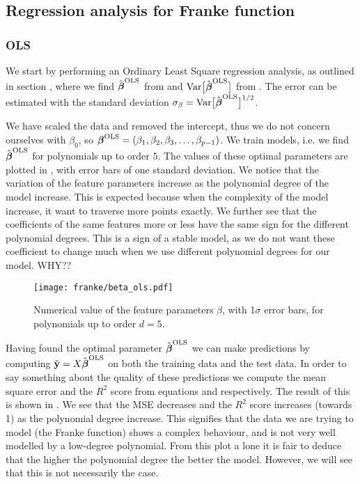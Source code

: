     \subsection{Regression analysis for Franke function}\label{sec:reganalysis_franke}

        \subsubsection{OLS}\label{sec:olsanalysis}
            We start by performing an Ordinary Least Square regression analysis, as outlined in section , where we find $\hat{\boldsymbol{\beta}}^\text{OLS}$ from  and $\text{Var}\big[\hat{\boldsymbol{\beta}}^{\text{OLS}}\big]$ from . The error can be estimated with the standard deviation $\mathbf{\sigma}_{\beta} = \text{Var}\big[\hat{\boldsymbol{\beta}}^{\text{OLS}}\big]^{1/2}$. 

            We have scaled the data and removed the intercept, thus we do not concern ourselves with $\beta_0$, so $\boldsymbol{\beta}^{\text{OLS}} = (\beta_1, \beta_2, \beta_3, \dots, \beta_{p-1})$. We train models, i.e. we find $\hat{\boldsymbol{\beta}}^{\text{OLS}}$ for polynomials up to order $5$. The values of these optimal parameters are plotted in , with error bars of one standard deviation. We notice that the variation of the feature parameters increase as the polynomial degree of the model increase. This is expected because when the complexity of the model increase, it want to traverse more points exactly. We further see that the coefficients of the same features more or less have the same sign for the different polynomial degrees. This is a sign of a stable model, as we do not want these coefficient to change much when we use different polynomial degrees for our model. WHY??

            \begin{figure}
                \texttt{[image: franke/beta\_ols.pdf]}
                \caption{Numerical value of the feature parameters $\beta$, with 1$\sigma$ error bars, for polynomials up to order $d=5$.}
                \label{fig:beta_with_standard_deviation}
            \end{figure}

            Having found the optimal parameter $\hat{\boldsymbol{\beta}}^{\text{OLS}}$ we can make predictions by computing $\tilde{\mathbf{y}} = X\hat{\boldsymbol{\beta}}^{\text{OLS}}$ on both the training data and the test data. In order to say something about the quality of these predictions we compute the mean square error and the $R^2$ score from equations  and  respectively. The result of this is shown in . We see that the MSE decreases and the $R^2$ score increases (towards 1) as the polynomial degree increase. This signifies that the data we are trying to model (the Franke function) shows a complex behaviour, and is not very well modelled by a low-degree polynomial. From this plot a lone it is fair to deduce that the higher the polynomial degree the better the model. However, we will see that this is not necessarily the case. 

